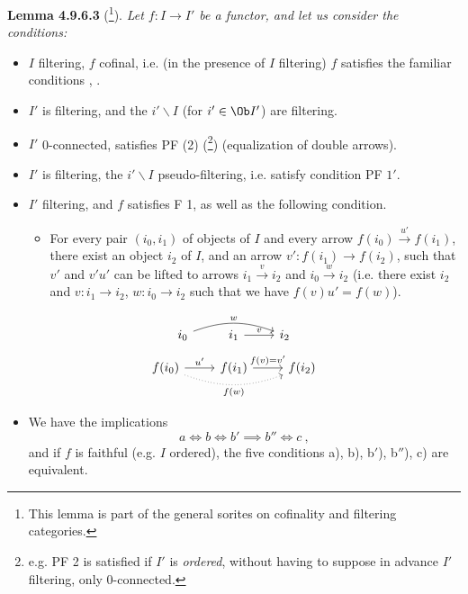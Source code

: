 \textbf{Lemma 4.9.6.3} (\footnote[99]{This lemma is part of the general sorites on cofinality and filtering categories.}). \textit{Let $f : I \longrightarrow I'$ be a functor, and let us consider the conditions:}
{\itshape
\begin{itemize}[label={}]
\item[a)] $I$ filtering, $f$ cofinal, i.e. (in the presence of $I$ filtering) $f$ satisfies the familiar conditions , .
\item[b)] $I'$ is filtering, and the $i'\backslash I$ (for $i' \in \Ob I'$) are filtering.
\item[b$'$)] $I'$ \textup{0}-connected, satisfies PF (2) \textup{(}\footnote[100]{e.g. PF 2 is satisfied if $I'$ is \textit{ordered}, without having to suppose in advance $I'$ filtering, only 0-connected.}\textup{)} (equalization of double arrows).
\item[b$''$)] $I'$ is filtering, the $i'\backslash I$ pseudo-filtering, i.e. satisfy condition PF $1'$.
\item[c)] $I'$ filtering, and $f$ satisfies F 1, as well as the following condition.
\begin{itemize}[label={}]
\item[\rbox{F 3}] For every pair $(i_0,i_1)$ of objects of $I$ and every arrow $f(i_0) \xrightarrow{u'} f(i_1)$, there exist an object $i_2$ of $I$, and an arrow $v' : f(i_1) \longrightarrow f(i_2)$, such that $v'$ and $v'u'$ can be lifted to arrows $i_1 \xrightarrow{v} i_2$ and $i_0 \xrightarrow{w} i_2$ (i.e. there exist $i_2$ and $v : i_1 \longrightarrow i_2$, $w : i_0 \longrightarrow i_2$ such that we have $f(v)u' = f(w)$).
\end{itemize}
\end{itemize}
\[
\begin{tikzcd}
i_0 \arrow[rr, bend left=20, "w"] & i_1 \arrow[r, "v"] & i_2 %
\end{tikzcd}
\]
\[
\begin{tikzcd}
f(i_0) \arrow[r, "u'"] \arrow[rr, dotted, bend right=20, "f(w)"'] & f(i_1) \arrow[r, "f(v) = v'"] & f(i_2)
\end{tikzcd}
\]
\begin{itemize}[label={}]
\item[1)] We have the implications
\[
a \iff b \iff b' \implies b'' \iff c \ ,
\]
and if $f$ is \textup{faithful} (e.g. $I$ ordered), the five conditions a), b), b$'$), b$''$), c) are equivalent.
\end{itemize}
}


